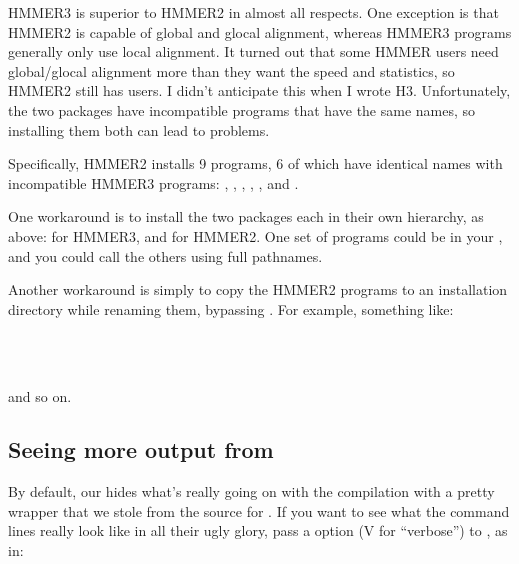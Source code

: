 HMMER3 is superior to HMMER2 in almost all respects. One exception is
that HMMER2 is capable of global and glocal alignment, whereas HMMER3
programs generally only use local alignment.  It turned out that some HMMER users need
global/glocal alignment more than they want the speed and statistics,
so HMMER2 still has users. I didn't anticipate this when I wrote
H3. Unfortunately, the two packages have incompatible programs that
have the same names, so installing them both can lead to problems.

Specifically, HMMER2 installs 9 programs, 6 of which have identical
names with incompatible HMMER3 programs: ,
, , , ,
and .

One workaround is to install the two packages each in their own
hierarchy, as above: 
for HMMER3, and  for
HMMER2. One set of programs could be in your , and you
could call the others using full pathnames.

Another workaround is simply to copy the HMMER2 programs to an
installation directory while renaming them, bypassing .
For example, something like:

  \vspace{1ex}
   \\
   \\
  \vspace{1ex}

and so on.

\subsection{Seeing more output from }

By default, our  hides what's really going on with the
compilation with a pretty wrapper that we stole from the source for
. If you want to see what the command lines really look like
in all their ugly glory, pass a  option (V for ``verbose'')
to , as in:

